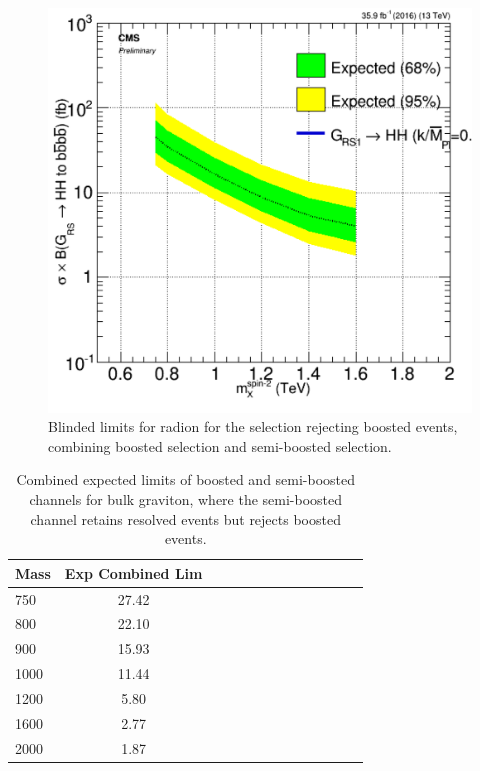 \begin{figure}[thb!]
\begin{center}
\includegraphics[scale=0.5]{Figures/brazflag_Rad_comb_v2.pdf}
\end{center}
\caption{Blinded limits for radion for the selection rejecting boosted events, combining boosted selection and semi-boosted selection.}
\label{fig:1p12p1Rad}
\end{figure} 

\begin{table}[h]
\begin{tabular}{|l|c|c|c|c|c|c|c|c|c|c|c|c|}
\hline
Mass & Exp Combined Lim \\ \hline
750 & 27.42 \\
800 & 22.10 \\
900 & 15.93 \\
1000 & 11.44 \\
1200 & 5.80 \\
1600 & 2.77 \\
2000 & 1.87 \\
\hline
\end{tabular}
\caption{Combined expected limits of boosted and semi-boosted channels for bulk graviton, where the semi-boosted channel retains resolved events but rejects boosted events.}
\label{tab:1p12p1BG}
\end{table}

